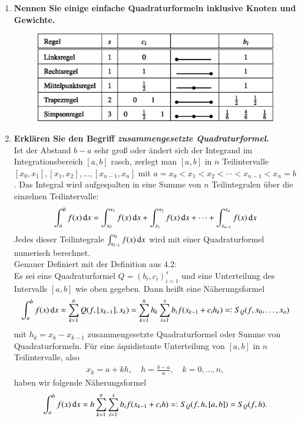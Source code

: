 \begin{enumerate}
		
		\item \textbf{Nennen Sie einige einfache Quadraturformeln inklusive Knoten und Gewichte.}
			\begin{figure}[htbp]
				\centering
				\includegraphics[width=0.6\linewidth]{kap4_2}
			\end{figure}
		
		\pagebreak
		
		\item \textbf{Erklären Sie den Begriff \textit{zusammengesetzte Quadraturformel}.} \\
			Ist der Abstand \(b-a\) sehr groß oder ändert sich der Integrand im Integrationsbereich \([a,b]\) rasch, zerlegt man \([a,b]\) in \(n\) Teilintervalle \([x_0,x_1],[x_1,x_2],\dots,[x_{n-1},x_n]\) mit \(a=x_0<x_1<x_2<\cdots<x_{n-1}<x_n=b\). Das Integral wird aufgespalten in eine Summe von \(n\) Teilintegralen über die einzelnen Teilintervalle:
			\begin{align*}
				\int_{a}^{b}f(x)\dif{x}=\int_{x_0}^{x_1}f(x)\dif{x}+\int_{x_1}^{x_2}f(x)\dif{x}+\cdots+\int_{x_{n-1}}^{x_n}f(x)\dif{x}
			\end{align*}
			Jedes dieser Teilintegrale \(\int_{x_{k-1}}^{x_k}f(x)\dif{x}\) wird mit einer Quadraturformel numerisch berechnet.\\
			Genauer Definiert mit der Definition aus 4.2: \\
			Es sei eine Quadraturformel \(Q=(b_i,c_i)^s_{i=1}\) und eine Unterteilung des Intervalls \([a,b]\) wie oben gegeben. Dann heißt eine Näherungsformel
			\begin{align*}
				\int_{a}^{b}f(x)\dif{x}\approx\sum_{k=1}^{n}Q(f,[x_{k-1}],x_k)=\sum_{k=1}^{n}h_k\sum_{i=1}^{s}b_if(x_{k-1}+c_ih_k)=:S_Q(f,x_0,\dots,x_n)
			\end{align*}
			mit \(h_k=x_k-x_{k-1}\) zusammengesetzte Quadraturformel oder Summe von Quadraturformeln. Für eine äquidistante Unterteilung von \([a,b]\) in \(n\) Teilintervalle, also
			\begin{align*}
				x_k=a+kh, \quad h=\frac{b-a}{n}, \quad k=0,\dots,n,
			\end{align*}
			haben wir folgende Näherungsformel
			\begin{align*}
				\int_{a}^{b}f(x)\dif{x}\approx h\sum_{k=1}^{n}\sum_{i=1}^{s}b_if(x_{k-1}+c_ih)=:S_Q(f,h,[a,b])=S_Q(f,h).
			\end{align*}
		

\end{enumerate}
